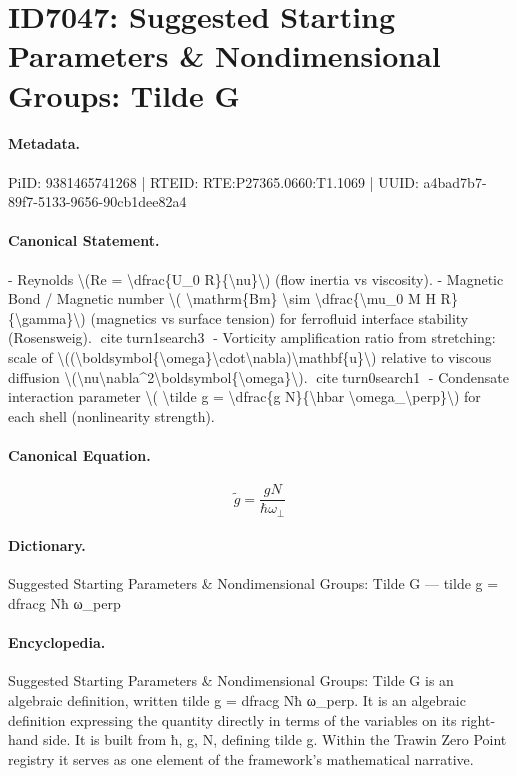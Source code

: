 \section*{ID7047: Suggested Starting Parameters \& Nondimensional Groups: Tilde G}
\paragraph{Metadata.}
PiID: 9381465741268 | RTEID: RTE:P27365.0660:T1.1069 | UUID: a4bad7b7-89f7-5133-9656-90cb1dee82a4

\paragraph{Canonical Statement.}
- Reynolds \textbackslash{}(Re = \textbackslash{}dfrac\{U\_0 R\}\{\textbackslash{}nu\}\textbackslash{}) (flow inertia vs viscosity). - Magnetic Bond / Magnetic number \textbackslash{}( \textbackslash{}mathrm\{Bm\} \textbackslash{}sim \textbackslash{}dfrac\{\textbackslash{}mu\_0 M H R\}\{\textbackslash{}gamma\}\textbackslash{}) (magnetics vs surface tension) for ferrofluid interface stability (Rosensweig). citeturn1search3 - Vorticity amplification ratio from stretching: scale of \textbackslash{}((\textbackslash{}boldsymbol\{\textbackslash{}omega\}\textbackslash{}cdot\textbackslash{}nabla)\textbackslash{}mathbf\{u\}\textbackslash{}) relative to viscous diffusion \textbackslash{}(\textbackslash{}nu\textbackslash{}nabla\textasciicircum{}2\textbackslash{}boldsymbol\{\textbackslash{}omega\}\textbackslash{}). citeturn0search1 - Condensate interaction parameter \textbackslash{}( \textbackslash{}tilde g = \textbackslash{}dfrac\{g N\}\{\textbackslash{}hbar \textbackslash{}omega\_\textbackslash{}perp\}\textbackslash{}) for each shell (nonlinearity strength).

\paragraph{Canonical Equation.}
\[
\tilde g = \dfrac{g N}{\hbar \omega_\perp}
\]

\paragraph{Dictionary.}
Suggested Starting Parameters \& Nondimensional Groups: Tilde G — tilde g = dfracg Nħ ω\_perp

\paragraph{Encyclopedia.}
Suggested Starting Parameters \& Nondimensional Groups: Tilde G is an algebraic definition, written tilde g = dfracg Nħ ω\_perp. It is an algebraic definition expressing the quantity directly in terms of the variables on its right-hand side. It is built from ħ, g, N, defining tilde g. Within the Trawin Zero Point registry it serves as one element of the framework's mathematical narrative.
